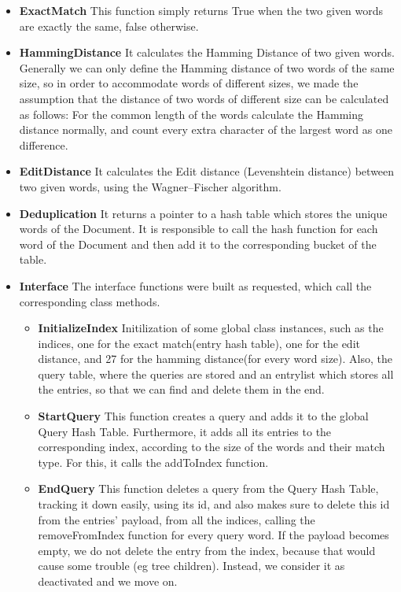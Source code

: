 \documentclass{article}
\begin{document}
\begin{itemize}
  \item \textbf{ExactMatch}
  This function simply returns True when the two given words are exactly the same, false otherwise.
  \item \textbf{HammingDistance}
  It calculates the Hamming Distance of two given words. Generally we can only define the Hamming distance of two words of the same size, so in order to accommodate words of different sizes, we made the assumption that the distance of two words of different size can be calculated as follows:
  For the common length of the words calculate the Hamming distance normally, and count every extra character of the largest word as one difference.
  \item \textbf{EditDistance}
  It calculates the Edit distance (Levenshtein distance) between two given words, using the Wagner–Fischer algorithm.
  \item \textbf{Deduplication} It returns a pointer to a hash table which stores the unique words of the Document. It is responsible to call the hash function for each word of the Document and then add it to the corresponding bucket of the table.
  \item \textbf{Interface} The interface functions were built as requested, which call the corresponding class methods.
  \begin{itemize}
  \item \textbf{InitializeIndex}
   Initilization of some global class instances, such as the indices, one for the exact  match(entry hash table), one for the edit distance, and 27 for the hamming distance(for every word size). Also, the query table, where the queries are stored and an entrylist which stores all the entries, so that we can find and delete them in the end.
  \item \textbf{StartQuery} 
   This function creates a query and adds it to the global Query Hash Table. Furthermore, it adds all its entries to the corresponding index, according to the size of the words and their match type. For this, it calls the addToIndex function.
  \item \textbf{EndQuery}
   This function deletes a query from the Query Hash Table, tracking it down easily, using its id, and also makes sure to delete this id from the entries' payload, from all the indices, calling the removeFromIndex function for every query word. If the payload becomes empty, we do not delete the entry from the index, because that would cause some trouble (eg tree children). Instead, we consider it as deactivated and we move on.

\end{itemize}
\end{itemize}
\end{document}
